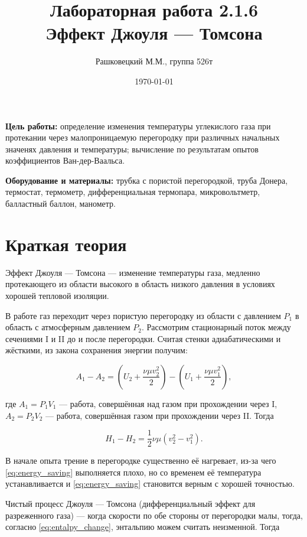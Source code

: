 \documentclass[12pt]{article}
\author{Рашковецкий М.М., группа 526т}
\date{\today}
\title{Лабораторная работа 2.1.6\\Эффект Джоуля --- Томсона}
\begin{document}
	\maketitle
	
	{\parindent=1cm \hangindent=1cm \parskip=0.5cm
	{\bfseries Цель работы:} определение изменения температуры углекислого газа при протекании через малопроницаемую перегородку при различных начальных значенях давления и температуры; вычисление по результатам опытов коэффициентов Ван-дер-Ваальса.
	
	\hangindent=1cm
	{\bfseries Оборудование и материалы:} трубка с пористой перегородкой, труба Донера, термостат, термометр, дифференциальная термопара, микровольтметр, балластный баллон, манометр.\par}
	\section*{Краткая теория}
	
	\indent Эффект Джоуля --- Томсона --- изменение температуры газа, медленно протекающего из области высокого в область низкого давления в условиях хорошей тепловой изоляции.
	
	В работе газ переходит через пористую перегородку из области с давлением $P_1$ в область с атмосферным давлением $P_2$. Рассмотрим стационарный поток между сечениями I и II до и после перегородки. Считая стенки адиабатическими и жёсткими, из закона сохранения энергии получим:
	
	\begin{equation}
	\label{eq:energy_saving}
	A_1-A_2=\left( U_2+\frac{\nu \mu v_2^2}{2} \right) - \left( U_1+\frac{\nu \mu v_1^2}{2} \right),
	\end{equation}
	
	где $A_1=P_1 V_1$ --- работа, совершённая над газом при прохождении через I, $A_2=P_2 V_2$ --- работа, совершённая газом при прохождении через II. Тогда
	
	\begin{equation}
	\label{eq:entalpy_change}
	H_1-H_2=\frac{1}{2} \nu \mu \left( v^2_2 - v^2_1 \right).
	\end{equation}
	
	В начале опыта трение в перегородке существенно её нагревает, из-за чего \eqref{eq:energy_saving} выполняется плохо, но со временем её температура устанавливается и \eqref{eq:energy_saving} становится верным с хорошей точностью.
	
	Чистый процесс Джоуля --- Томсона (дифференциальный эффект для разреженного газа) --- когда скорости по обе стороны от перегородки малы, тогда, согласно \eqref{eq:entalpy_change}, энтальпию можем считать неизменной. Тогда
	
\end{document}
